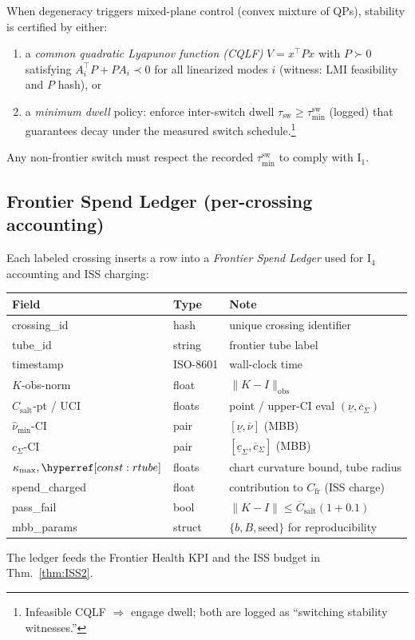 \begin{theorem}\label{thm:switching}
\emph{}
When degeneracy triggers mixed-plane control (convex mixture of QPs), stability is certified by either:
\begin{enumerate}[leftmargin=*,itemsep=2pt]
\item a \emph{common quadratic Lyapunov function (CQLF)} $V=x^\top P x$ with $P\succ0$ satisfying $A_i^\top P+P A_i\prec 0$ for all linearized modes $i$ (witness: LMI feasibility and $P$ hash), or
\item a \emph{minimum dwell} policy: enforce inter-switch dwell $\tau_{\mathrm{sw}}\ge \tau_{\min}^{\mathrm{sw}}$ (logged) that guarantees decay under the measured switch schedule.\footnote{Infeasible CQLF $\Rightarrow$ engage dwell; both are logged as “switching stability witnesses.”}
\end{enumerate}
Any non-frontier switch must respect the recorded $\tau_{\min}^{\mathrm{sw}}$ to comply with I$_1$.
\end{theorem}

\subsection*{Frontier Spend Ledger (per-crossing accounting)}\label{subsec:frontier-ledger}
\noindent
Each labeled crossing inserts a row into a \emph{Frontier Spend Ledger} used for I$_4$ accounting and ISS charging:
\begin{center}
\renewcommand{\arraystretch}{1.06}
\begin{tabularx}{\textwidth}{@{} l l X @{}}
\toprule
\textbf{Field} & \textbf{Type} & \textbf{Note} \\
\midrule
crossing\_id & hash & unique crossing identifier \\
tube\_id & string & frontier tube label \\
timestamp & ISO-8601 & wall-clock time \\
$K$-obs-norm & float & $\|K{-}I\|_{\text{obs}}$ \\
$C_{\mathrm{salt}}$-pt / UCI & floats & point / upper-CI eval $(\underline\nu,\overline c_\Sigma)$ \\
$\hat\nu_{\min}$-CI & pair & $[\underline\nu,\overline\nu]$ (MBB) \\
$c_\Sigma$-CI & pair & $[\underline c_\Sigma,\overline c_\Sigma]$ (MBB) \\
$\kappa_{\max},\constref{rtube}$ & floats & chart curvature bound, tube radius \\
spend\_charged & float & contribution to $C_{\mathrm{fr}}$ (ISS charge) \\
pass\_fail & bool & $\|K{-}I\|\le \overline C_{\mathrm{salt}}(1{+}0.1)$ \\
mbb\_params & struct & $\{b,B,\text{seed}\}$ for reproducibility \\
\bottomrule
\end{tabularx}
\end{center}
The ledger feeds the Frontier Health KPI and the ISS budget in Thm.~\ref{thm:ISS2}.

